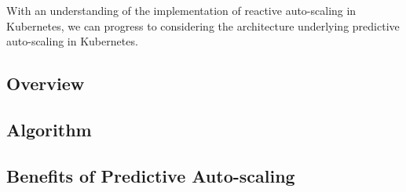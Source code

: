 With an understanding of the implementation of reactive auto-scaling in
Kubernetes, we can progress to considering the architecture underlying
predictive auto-scaling in Kubernetes.

\subsection{Overview}



\subsection{Algorithm}



\subsection{Benefits of Predictive Auto-scaling}
\label{architecture-predictive-autoscaling-in-relation-to-kubernetes-benefits-of-predictive-autoscaling}


